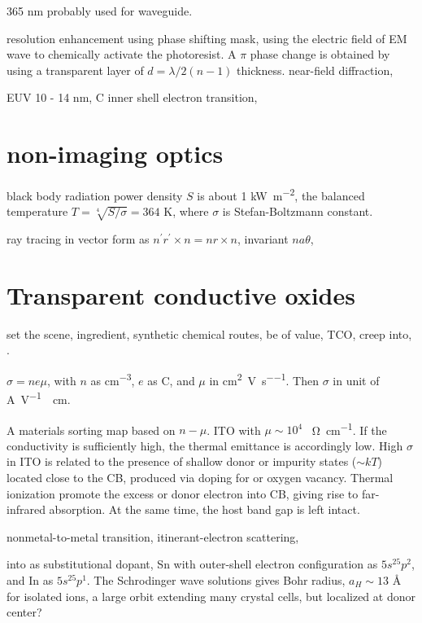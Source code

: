 365 nm probably used for  waveguide. 

resolution enhancement using phase shifting mask,  using the electric field of EM wave to chemically activate the photoresist. A $\pi$ phase change is obtained by using a transparent layer of $d = \lambda/2(n - 1)$ thickness. near-field diffraction, 

EUV 10 - 14 nm, C inner shell electron transition, 


\section{non-imaging optics}

black body radiation power density $S$ is about 1 \si{kW\per m^2}, the balanced temperature $T = \sqrt[4]{S/\sigma} = 364$ K, where $\sigma$ is Stefan-Boltzmann constant. 

ray tracing in vector form as $n^{\prime} r^{\prime} \times n = n r \times n$, invariant $na\theta$, 


\section{Transparent conductive oxides}

set the scene, ingredient, synthetic chemical routes, be of value, TCO, creep into, . \cite{Edwards2004}

$\sigma = ne\mu$, with $n$ as \si{cm^{-3}}, $e$ as C, and $\mu$ in \si{cm^2\per V\per s}. Then $\sigma$ in unit of \si{A\per V \per cm}. 

A materials sorting map based on $n-\mu$. ITO with $\mu\sim10^4$ \si{\per\ohm cm^{-1}}. If the conductivity is sufficiently high, the thermal emittance is accordingly low. High $\sigma$ in ITO is related to the presence of shallow donor or impurity states ($\sim kT$) located close to the  CB, produced via  doping for  or oxygen vacancy. Thermal ionization promote the excess or donor electron into CB, giving rise to far-infrared absorption. At the same time, the host band gap is left intact. 

nonmetal-to-metal transition, itinerant-electron scattering, 

 into  as substitutional dopant, Sn with outer-shell electron configuration as $5s^25p^2$, and In as $5s^25p^1$. The Schrodinger wave solutions gives Bohr radius, $a_H \sim 13$ \si{\angstrom} for isolated ions, a large orbit extending many crystal cells, but localized at donor center?

